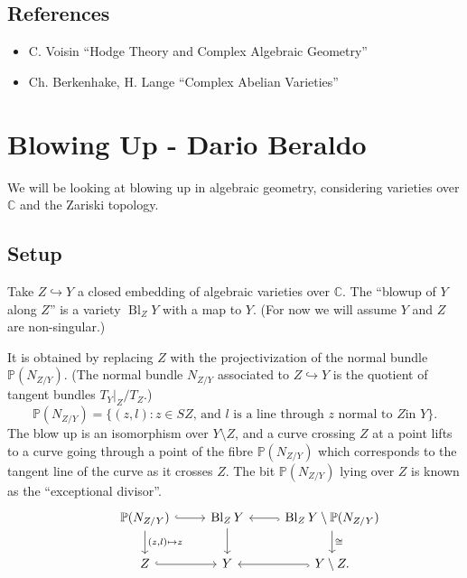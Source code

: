 \documentclass{article}
\theoremstyle{definition}
\DeclareMathOperator{\Bl}{Bl}
\renewcommand{\P}{\mathbb{P}}
\newcommand{\C}{\mathbb{C}}
\begin{document}
\subsection*{References}

\begin{itemize}
    \item C. Voisin ``Hodge Theory and Complex Algebraic Geometry''
    \item Ch. Berkenhake, H. Lange ``Complex Abelian Varieties''
\end{itemize}

\newpage

\section{Blowing Up - Dario Beraldo}

We will be looking at blowing up in algebraic geometry, considering
varieties over $\C$ and the Zariski topology.

\subsection*{Setup}

Take $Z\hookrightarrow Y$ a closed embedding of algebraic varieties over $\C$.
The ``blowup of $Y$ along $Z$'' is a variety $\Bl_ZY$ with a map to $Y$. (For
now we will assume $Y$ and $Z$ are non-singular.)

It is obtained by replacing $Z$ with the projectivization of the normal bundle
$\P(N_{Z/Y})$. (The normal bundle $N_{Z/Y}$ associated to $Z\hookrightarrow Y$
is the quotient of tangent bundles $T_Y|_Z/T_Z$.)
\begin{equation*}
    \P(N_{Z/Y})
        = \{(z,l):\text{$z\in SZ$, and $l$ is a line through $z$ normal to $Z$
            in $Y$}\}.
\end{equation*}
The blow up is an isomorphism over $Y\setminus Z$, and a curve crossing $Z$ at a
point lifts to a curve going through a point of the fibre $\P(N_{Z/Y})$ which
corresponds to the tangent line of the curve as it crosses $Z$. The bit
$\P(N_{Z/Y})$ lying over $Z$ is known as the ``exceptional divisor''.
\begin{equation*}
    \begin{tikzcd}
        &\P(N_{Z/Y}) \ar[r,hook] \ar[d,"{(z,l)\mapsto z}"]
        &\Bl_ZY \ar[d]
        &\Bl_ZY\setminus\P(N_{Z/Y}) \ar[l,hook] \ar[d,"\cong"] \\
        &Z \ar[r,hook] &Y &Y\setminus Z \ar[l,hook].
    \end{tikzcd}
\end{equation*}
\end{document}
